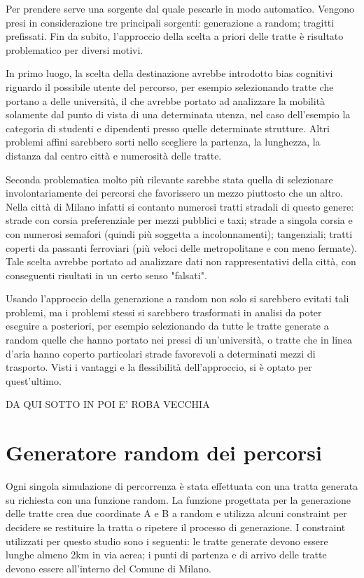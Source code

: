 Per prendere serve una sorgente dal quale pescarle in modo automatico. Vengono presi in considerazione tre principali sorgenti: generazione a random; tragitti prefissati. Fin da subito, l'approccio della scelta a priori delle tratte è risultato problematico per diversi motivi.

In primo luogo, la scelta della destinazione avrebbe introdotto bias cognitivi riguardo il possibile utente del percorso, per esempio selezionando tratte che portano a delle università, il che avrebbe portato ad analizzare la mobilità solamente dal punto di vista di una determinata utenza, nel caso dell'esempio la categoria di studenti e dipendenti presso quelle determinate strutture. Altri problemi affini sarebbero sorti nello scegliere la partenza, la lunghezza, la distanza dal centro città e numerosità delle tratte.

Seconda problematica molto più rilevante sarebbe stata quella di selezionare involontariamente dei percorsi che favorissero un mezzo piuttosto che un altro. Nella città di Milano infatti si contanto numerosi tratti stradali di questo genere: strade con corsia preferenziale per mezzi pubblici e taxi; strade a singola corsia e con numerosi semafori (quindi più soggetta a incolonnamenti); tangenziali; tratti coperti da passanti ferroviari (più veloci delle metropolitane e con meno fermate). Tale scelta avrebbe portato ad analizzare dati non rappresentativi della città, con conseguenti risultati in un certo senso "falsati".

Usando l'approccio della generazione a random non solo si sarebbero evitati tali problemi, ma i problemi stessi si sarebbero trasformati in analisi da poter eseguire a posteriori, per esempio selezionando da tutte le tratte generate a random quelle che hanno portato nei pressi di un'università, o tratte che in linea d'aria hanno coperto particolari strade favorevoli a determinati mezzi di trasporto. Visti i vantaggi e la flessibilità dell'approccio, si è optato per quest'ultimo.

DA QUI SOTTO IN POI E' ROBA VECCHIA

\section{Generatore random dei percorsi}

Ogni singola simulazione di percorrenza è stata effettuata con una tratta generata su richiesta con una funzione random. La funzione progettata per la generazione delle tratte crea due coordinate A e B a random e utilizza alcuni constraint per decidere se restituire la tratta o ripetere il processo di generazione. I constraint utilizzati per questo studio sono i seguenti: le tratte generate devono essere lunghe almeno 2km in via aerea; i punti di partenza e di arrivo delle tratte devono essere all'interno del Comune di Milano.

